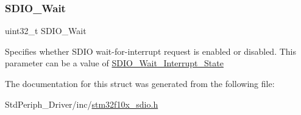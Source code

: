 \subsubsection{\texorpdfstring{SDIO\_Wait}{SDIO\_Wait}}
{\footnotesize\ttfamily uint32\+\_\+t S\+D\+I\+O\+\_\+\+Wait}

Specifies whether S\+D\+IO wait-\/for-\/interrupt request is enabled or disabled. This parameter can be a value of \mbox{\hyperlink{group___s_d_i_o___wait___interrupt___state}{S\+D\+I\+O\+\_\+\+Wait\+\_\+\+Interrupt\+\_\+\+State}} 

The documentation for this struct was generated from the following file\+:\begin{DoxyCompactItemize}
\item 
Std\+Periph\+\_\+\+Driver/inc/\mbox{\hyperlink{stm32f10x__sdio_8h}{stm32f10x\+\_\+sdio.\+h}}\end{DoxyCompactItemize}
